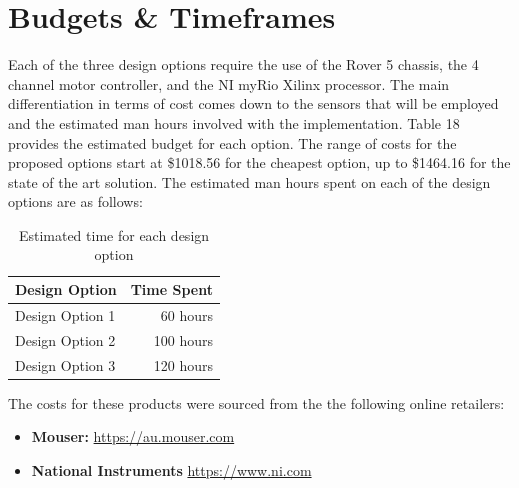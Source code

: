 \documentclass[a4paper]{article}
\begin{document}
\section{Budgets \& Timeframes}
Each of the three design options require the use of the Rover 5 chassis, the 4 channel motor controller, and the NI myRio Xilinx processor. The main differentiation in terms of cost comes down to the sensors that will be employed and the estimated man hours involved with the implementation. Table 18 provides the estimated budget for each option. The range of costs for the proposed options start at \$1018.56 for the cheapest option, up to \$1464.16 for the state of the art solution. The estimated man hours spent on each of the design options are as follows:\\
\begin{table}[h]
\centering
\caption{Estimated time for each design option}\footnotesize
\begin{tabular}{lr}
\toprule
\textbf{Design Option} & \textbf{Time Spent}\\
\midrule
Design Option 1 & 60 hours\\
Design Option 2 & 100 hours\\
Design Option 3 & 120 hours\\
\bottomrule
\end{tabular}
\end{table}

The costs for these products were sourced from the the following online retailers:
\begin{itemize}
\item \textbf{Mouser:} \url{https://au.mouser.com}
\item \textbf{National Instruments} \url{https://www.ni.com}
\end{itemize}
\end{document}
